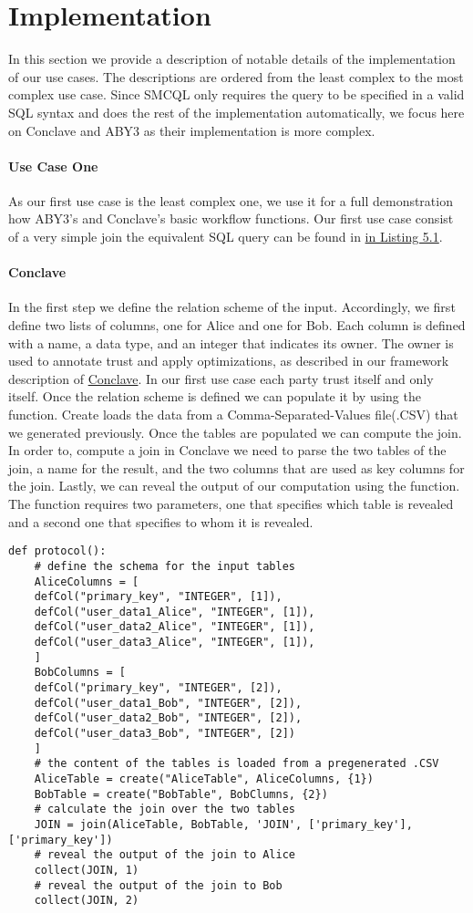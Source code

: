 \section{Implementation}
In this section we provide a description of notable details of the implementation of our use cases. 
The descriptions are ordered from the least complex to the most complex use case. Since SMCQL only requires the query to be specified in a valid SQL syntax and does the rest of the implementation automatically, we focus here on Conclave and ABY3 as their implementation is more complex.    
\paragraph{Use Case One}
As our first use case is the least complex one, we use it for a full demonstration how ABY3's and Conclave's basic workflow functions. Our first use case consist of a very simple join the equivalent SQL query can be found in \hyperref[SQL1_label]{ in Listing 5.1}.
\paragraph{Conclave} 
In the first step we define the relation scheme of the input. Accordingly, we first define two lists of columns, one for Alice and one for Bob. Each column is defined with a name, a data type, and an integer that indicates its owner. The owner is used to annotate trust and apply optimizations, as described in our framework description of \hyperref[Trust_label]{Conclave}. In our first use case each party trust itself and only itself. Once the relation scheme is defined we can populate it by using the  function. Create loads the data from a  Comma-Separated-Values file(.CSV) that we generated previously. Once the tables are populated we can compute the join. In order to, compute a join in Conclave we need to parse the two tables of the join, a name for the result, and the two columns that are used as key columns for the join. 
Lastly, we can reveal the output of our computation using the  function. The  function requires two parameters, one that specifies which table is revealed and a second one that specifies to whom it is revealed.
\begin{lstlisting}[caption={ The Python protocol of Conclave for our first use case    }]
def protocol():
	# define the schema for the input tables 
	AliceColumns = [
	defCol("primary_key", "INTEGER", [1]),
	defCol("user_data1_Alice", "INTEGER", [1]),
	defCol("user_data2_Alice", "INTEGER", [1]),
	defCol("user_data3_Alice", "INTEGER", [1]),
	]
	BobColumns = [
	defCol("primary_key", "INTEGER", [2]),
	defCol("user_data1_Bob", "INTEGER", [2]),
	defCol("user_data2_Bob", "INTEGER", [2]),
	defCol("user_data3_Bob", "INTEGER", [2])
	]
	# the content of the tables is loaded from a pregenerated .CSV
	AliceTable = create("AliceTable", AliceColumns, {1})
	BobTable = create("BobTable", BobClumns, {2})
	# calculate the join over the two tables 
	JOIN = join(AliceTable, BobTable, 'JOIN', ['primary_key'], ['primary_key'])
	# reveal the output of the join to Alice
	collect(JOIN, 1)
	# reveal the output of the join to Bob
	collect(JOIN, 2)
\end{lstlisting}

